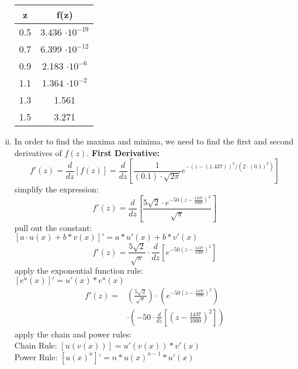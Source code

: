\documentclass[12pt]{article}
\begin{document}
\begin{enumerate}[i.]
    \begin{tabular}{c|c}
           z& f(z)\\ \hline
           0.5 & 3.436 $\cdot 10^{-19}$\\
           0.7 & 6.399 $\cdot 10^{-12}$\\
           0.9& 2.183 $\cdot 10^{-6}$\\
           1.1& 1.364 $\cdot 10^{-2}$\\
           1.3& 1.561 \\
           1.5& 3.271
    \end{tabular}{}
    \newline
    \item In order to find the maxima and minima, we need to find the first and second derivatives of $f(z)$. \newline
    \textbf{First Derivative:}
    \begin{equation}
        f'(z) = \frac{d}{dz}[f(z)] = \frac{d}{dz}[\frac{1}{(0.1) \cdot \sqrt{2 \pi}} e^{-(z-(1.437))^{2} /\left(2 \cdot (0.1)^{2}\right)}]
    \end{equation}
    simplify the expression:
    \begin{equation}
        f'(z) = \frac{d}{dz} \left [\frac{5 \sqrt{2} \cdot e^{-50(z-\frac{1437}{1000})^2}}{\sqrt{\pi}} \right ]
    \end{equation}
    pull out the constant: \\
    $[a \cdot u(x) + b*v(x)]' = a*u'(x) + b*v'(x)$
    \begin{equation}
        f'(z) = \frac{5 \sqrt{2}}{\sqrt{\pi}} \cdot \frac{d}{dz} \left [e^{-50(z-\frac{1437}{1000})^2} \right ]
    \end{equation}
    apply the exponential function rule: \\
    $[e^u(x)]' = u'(x) * e^u(x)$
    \begin{equation}
        \begin{aligned}
            f'(z) = {}
            & \left (\frac{5 \sqrt{2}}{\sqrt{\pi}} \right ) \cdot \left (e^{-50(z-\frac{1437}{1000})^2} \right ) \\
            & \cdot \left ( -50 \cdot \frac{d}{dz} \left [\left (z-\frac{1437}{1000} \right )^2 \right ] \right )
        \end{aligned}
    \end{equation}
    apply the chain and power rules: \\
    Chain Rule: $[u(v(x))] = u'(v(x)) * v'(x)$ \\
    Power Rule: $[u(x)^n]' = n*u(x)^{n-1} * u'(x)$ \\

\end{enumerate}
\end{document}
